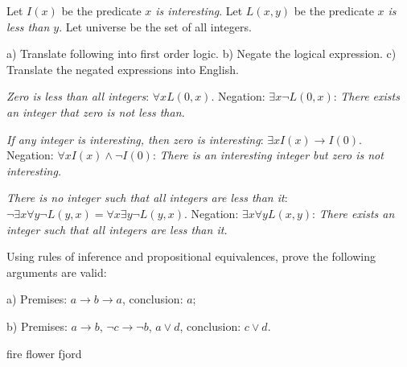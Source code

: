 \begin{prob}

Let $I(x)$ be the predicate \textit{$x$ is interesting}. Let $L(x, y)$ be the predicate \textit{$x$ is less than $y$}. Let universe be the set of all integers.

a) Translate following into first order logic. b) Negate the logical expression. c) Translate the negated expressions into English.

\textit{Zero is less than all integers}: $\forall x L(0, x)$. Negation: $\exists x \lnot L(0, x)$: \textit{There exists an integer that zero is not less than.}

\textit{If any integer is interesting, then zero is interesting}: $\exists x I(x) \rightarrow I(0)$. Negation: $\forall x I(x) \land \lnot I(0)$: \textit{There is an interesting integer but zero is not interesting.}

\textit{There is no integer such that all integers are less than it}: $\lnot \exists x \forall y \lnot L(y, x) = \forall x \exists y \lnot L(y, x)$. Negation: $\exists x \forall y L(x, y)$: \textit{There exists an integer such that all integers are less than it.}

\end{prob}

\begin{prob}

Using rules of inference and propositional equivalences, prove the following arguments are valid:

a) Premises: $a \rightarrow b \rightarrow a$, conclusion: $a$;

b) Premises: $a \rightarrow b$, $\lnot c \rightarrow \lnot b$, $a \lor d$, conclusion: $c \lor d$.

\end{prob}






fire flower fjord

